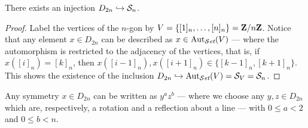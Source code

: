 \begin{proposition}\label{prop: dihetral-to-sym}
  There exists an injection \(D_{2n} \hookrightarrow \mathcal S_n\).
\end{proposition}

\begin{proof}
  Label the vertices of the \(n\)-gon by \(V = \{[1]_n, \dots, [n]_n\} =
  \mathbf{Z}/n\mathbf{Z}\). Notice that any element \(x \in D_{2n}\) can be described as \(x \in
  \operatorname{Aut}_{\mathcal{S}\textit{et}}(V)\) --- where the automorphism is restricted to the adjacency of
  the vertices, that is, if \(x([i]_n) = [k]_n\), then \(x([i - 1]_n), x([i +
  1]_n) \in \{[k - 1]_n, [k + 1]_n\}\). This shows the existence of the
  inclusion \(D_{2n} \hookrightarrow \operatorname{Aut}_{\mathcal{S}\textit{et}}(V) = \mathcal S_V = \mathcal S_n\).
\end{proof}

\begin{proposition}
  Any symmetry \(x \in D_{2n}\) can be written as \(y^a z^b\) --- where we
  choose any \(y, z \in D_{2n}\) which are, respectively, a rotation and a
  reflection about a line --- with \(0 \leq a < 2\) and \(0 \leq b < n\).
\end{proposition}

